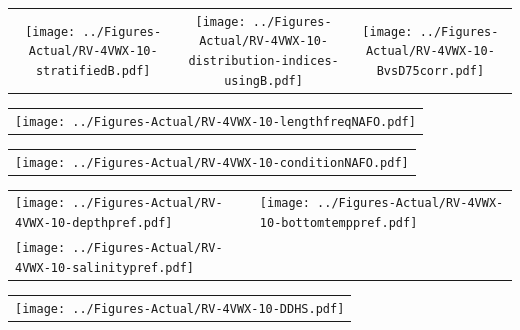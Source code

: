 \documentclass[12pt]{article}\usepackage[]{graphicx}\usepackage[]{color}
\begin{document}
\vspace{1cm}
\begin{minipage}{1.0\textwidth}
 \begin{tabular}{ccc}
\texttt{[image: ../Figures-Actual/RV-4VWX-10-stratifiedB.pdf]} & 
\texttt{[image: ../Figures-Actual/RV-4VWX-10-distribution-indices-usingB.pdf]} & 
\texttt{[image: ../Figures-Actual/RV-4VWX-10-BvsD75corr.pdf]} \\ 
\end{tabular} 
\end{minipage}
\clearpage
\begin{minipage}{1.0\textwidth}
 \begin{tabular}{c}
\texttt{[image: ../Figures-Actual/RV-4VWX-10-lengthfreqNAFO.pdf]} \\ 
\end{tabular} 
\end{minipage}
\newline

\vspace{1cm}
\begin{minipage}{1.0\textwidth}
 \begin{tabular}{c}
\texttt{[image: ../Figures-Actual/RV-4VWX-10-conditionNAFO.pdf]} \\ 
\end{tabular} 
\end{minipage}
\clearpage
\begin{minipage}{1.0\textwidth}
 \begin{tabular}[t]{m{3in}m{3in}}
\texttt{[image: ../Figures-Actual/RV-4VWX-10-depthpref.pdf]} & 
\texttt{[image: ../Figures-Actual/RV-4VWX-10-bottomtemppref.pdf]} \\ 
\texttt{[image: ../Figures-Actual/RV-4VWX-10-salinitypref.pdf]} & 
 \\ 
\end{tabular} 
\end{minipage}
\newline

\vspace{1cm}
\begin{minipage}{1.0\textwidth}
 \begin{tabular}{c}
\texttt{[image: ../Figures-Actual/RV-4VWX-10-DDHS.pdf]} \\ 
\end{tabular} 
\end{minipage}
\clearpage
\end{document}
